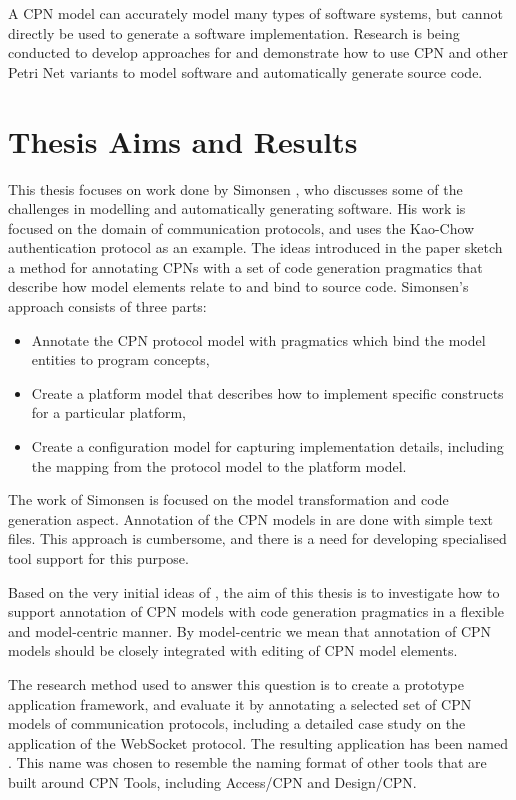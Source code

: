A CPN model can accurately model many types of software systems, but cannot
directly be used to generate a software implementation. Research is being
conducted to develop approaches for and demonstrate how to use CPN and other
Petri Net variants to model software and automatically generate source code.


\section{Thesis Aims and Results}
This thesis focuses on work done by Simonsen \cite{Simonsen2011}, who discusses
some of the challenges in modelling and automatically generating software. His
work is focused on the domain of communication protocols, and uses the Kao-Chow
authentication protocol as an example.
The ideas introduced in the paper sketch a method for annotating CPNs with a
set of code generation pragmatics that describe how model elements relate to and
bind to source code. Simonsen's approach consists of three parts: 
\begin{itemize}
	\item Annotate the CPN protocol model with pragmatics which bind the model
	entities to program concepts,
	\item Create a platform	model that describes how to implement specific
	constructs for a particular platform,
	\item Create a configuration model for capturing implementation details,
	including the mapping from the protocol model to the platform model.   
\end{itemize}  

The work of Simonsen \cite{Simonsen2011} is focused on the model transformation
and code generation aspect. Annotation of the CPN models in \cite{Simonsen2011}
are done with simple text files. This approach is cumbersome, and there is a
need for developing specialised tool support for this purpose.

Based on the very initial ideas of \cite{Simonsen2011}, the aim of this thesis
is to investigate how to support annotation of CPN models with code generation
pragmatics in a flexible and model-centric manner. By model-centric we mean that
annotation of CPN models should be closely integrated with editing of CPN model
elements.

The research method used to answer this question is to create a prototype
application framework, and evaluate it by annotating a selected set of CPN
models of communication protocols, including a detailed case study on the
application of the WebSocket protocol. The resulting application has been named
\thename{}. This name was chosen to resemble the naming format of other tools that
are built around CPN Tools, including Access/CPN and Design/CPN.

